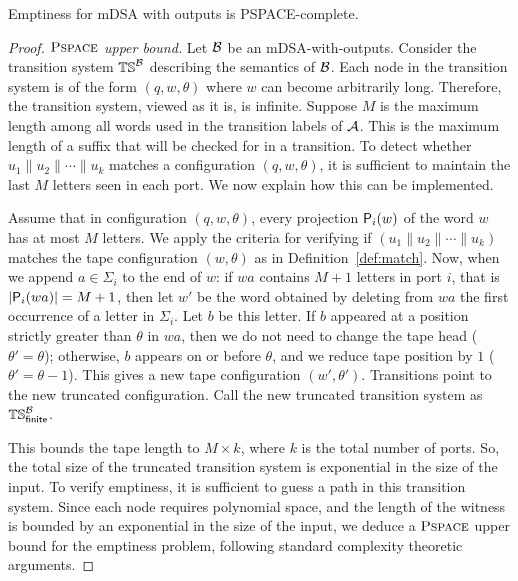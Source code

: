 

\begin{theorem}\label{thm:complexity}
Emptiness for mDSA with outputs is PSPACE-complete.
\end{theorem}
\begin{proof}
    
    \emph{$\operatorname{\textsc{Pspace}}$ upper bound.} Let $\mathcal{B}$ be an mDSA-with-outputs. Consider the transition system $\mathbb{TS}^{\mathcal{B}}$ describing the semantics of $\mathcal{B}$. Each node in the transition system is of the form $(q, w, \theta)$ where $w$ can become arbitrarily long. Therefore, the transition system, viewed as it is, is infinite. Suppose $M$ is the maximum length among all words used in the transition labels of $\mathcal{A}$. This is the maximum length of a suffix that will be checked for in a transition. To detect whether $u_1 \parallel u_2 \parallel \cdots \parallel u_k$ matches a configuration $(q, w, \theta)$, it is sufficient to maintain the last $M$ letters seen in each port. We now explain how this can be implemented.
    
    Assume that in configuration $(q, w, \theta)$, every projection $\mathsf{P}_{i}(w)$ of the word $w$ has at most $M$ letters. We apply the criteria for verifying if $(u_1 \parallel u_2 \parallel \cdots \parallel u_k)$ matches the tape configuration $(w, \theta)$ as in Definition~\ref{def:match}. Now, when we append $a \in \Sigma_i$ to the end of $w$: if $wa$ contains $M+1$ letters in port $i$, that is $|\mathsf{P}_{i}(wa)| = M+1$, then let $w'$ be the word obtained by deleting from $wa$ the first occurrence of a letter in $\Sigma_i$. Let $b$ be this letter. If $b$ appeared at a position strictly greater than $\theta$ in $wa$, then we do not need to change the tape head ($\theta' = \theta$); otherwise, $b$ appears on or before $\theta$, and we reduce tape position by $1$ ($\theta' = \theta - 1$). This gives a new tape configuration $(w', \theta')$. Transitions point to the new truncated configuration. Call the new truncated transition system as $\mathbb{TS}_{\mathsf{finite}}^{\mathcal{B}}$.
    
    
    This bounds the tape length to $M \times k$, where $k$ is the total number of ports. So, the total size of the truncated transition system is exponential in the size of the input. To verify emptiness, it is sufficient to guess a path in this transition system. Since each node requires polynomial space, and the length of the witness is bounded by an exponential in the size of the input, we deduce a $\operatorname{\textsc{Pspace}}$ upper bound for the emptiness problem, following standard complexity theoretic arguments. 


\end{proof}
